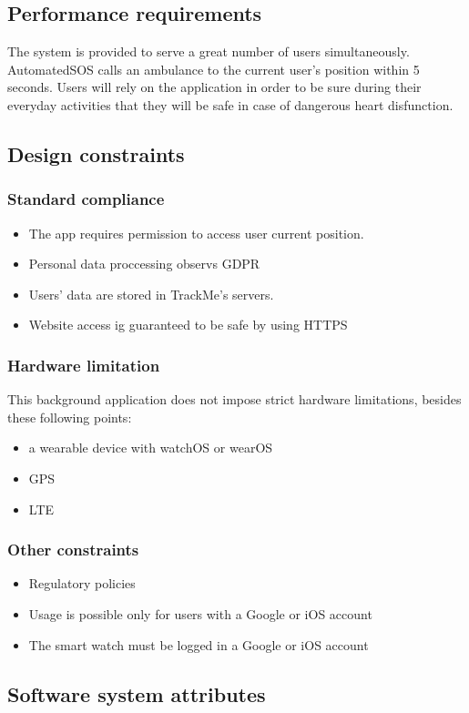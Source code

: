 \documentclass{article}
\begin{document}
\subsection{Performance requirements}
The system is provided to serve a great number of users simultaneously. AutomatedSOS calls an ambulance to the current user's position within 5 seconds. Users will rely on the application in order to be sure during their everyday activities that they will be safe in case of dangerous heart disfunction.
\subsection{Design constraints}
\subsubsection{Standard compliance}
\begin{itemize}
\item The app requires permission to access user current position.
\item Personal data proccessing observs GDPR
\item Users' data are stored in TrackMe's servers.
\item Website access ig guaranteed to be safe by using HTTPS
\end{itemize}
\subsubsection{Hardware limitation}
This background application does not impose strict hardware limitations, besides these following points:
\begin{itemize}
\item a wearable device with watchOS or wearOS
\item GPS
\item LTE
\end{itemize}
\subsubsection{Other constraints}
\begin{itemize}
\item Regulatory policies
\item Usage is possible only for users with a Google or iOS account
\item The smart watch must be logged in a Google or iOS account
\end{itemize}
\subsection{Software system attributes}
\end{document}
